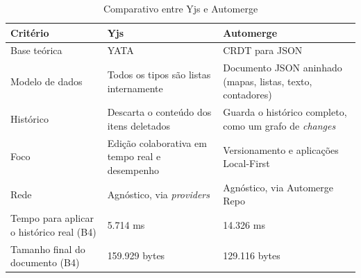 \begin{table}[htb]
    \centering
    \caption{Comparativo entre Yjs e Automerge}
    \label{tab:yjs-automerge}
    \begin{tabular}{|p{}|p{}|p{}|}
        \hline
        \textbf{Critério} & \textbf{Yjs} & \textbf{Automerge} \\ \hline
        Base teórica & YATA \cite{nicolaescu2016} & CRDT para JSON \cite{kleppmannberesford2017} \\ \hline
        Modelo de dados & Todos os tipos são listas internamente & Documento JSON aninhado (mapas, listas, texto, contadores) \\ \hline
        Histórico & Descarta o conteúdo dos itens deletados & Guarda o histórico completo, como um grafo de \textit{changes} \\ \hline
        Foco & Edição colaborativa em tempo real e desempenho & Versionamento e aplicações Local-First \\ \hline
        Rede & Agnóstico, via \textit{providers} & Agnóstico, via Automerge Repo \\ \hline
        Tempo para aplicar o histórico real (B4) & 5.714 ms & 14.326 ms \\ \hline
        Tamanho final do documento (B4) & 159.929 bytes & 129.116 bytes \\ \hline
    \end{tabular}
\end{table}
